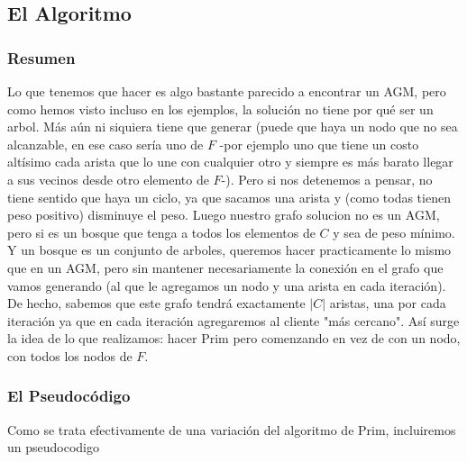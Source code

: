 \documentclass[A4paper,oneside,fleqn,11pt]{article}
\theoremstyle{definition}
\begin{document}
\subsection{El Algoritmo}

\subsubsection{Resumen}
Lo que tenemos que hacer es algo bastante parecido a encontrar un AGM, pero como hemos visto incluso en los ejemplos, la solución no tiene por qué ser un arbol. Más aún ni siquiera tiene que generar (puede que haya un nodo que no sea alcanzable, en ese caso sería uno de $F$ -por ejemplo uno que tiene un costo altísimo cada arista que lo une con cualquier otro y siempre es más barato llegar a sus vecinos desde otro elemento de $F$-). Pero si nos detenemos a pensar, no tiene sentido que haya un ciclo, ya que sacamos una arista y (como todas tienen peso positivo) disminuye el peso. Luego nuestro grafo solucion no es un AGM, pero si es un bosque que tenga a todos los elementos de $C$ y sea de peso mínimo. Y un bosque es un conjunto de arboles, queremos hacer practicamente lo mismo que en un AGM, pero sin mantener necesariamente la conexión en el grafo que vamos generando (al que le agregamos un nodo y una arista en cada iteración). De hecho, sabemos que este grafo tendrá exactamente $|C|$ aristas, una por cada iteración ya que en cada iteración agregaremos al cliente "más cercano". Así surge la idea de lo que realizamos: hacer Prim pero comenzando en vez de con un nodo, con todos los nodos de $F$.
\subsubsection{El Pseudocódigo}
 Como se trata efectivamente de una variación del algoritmo de Prim, incluiremos un pseudocodigo
\end{document}
